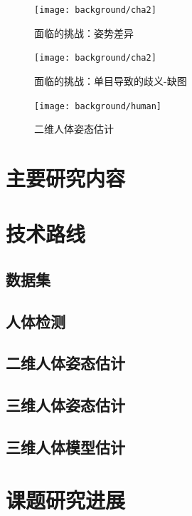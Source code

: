 \begin{figure}[ht]
    \centering
    \texttt{[image: background/cha2]}
    \caption{\label{fig:cha2}面临的挑战：姿势差异}
\end{figure}

\begin{figure}[ht]
    \centering
    \texttt{[image: background/cha2]}
    \caption{\label{fig:cha3}面临的挑战：单目导致的歧义-缺图}
\end{figure}

\begin{figure}[ht]
    \centering
    \texttt{[image: background/human]}
    \caption{\label{fig:cha3}二维人体姿态估计}
\end{figure}

\section{主要研究内容}

\section{技术路线}

\subsection{数据集}

\subsection{人体检测}

\subsection{二维人体姿态估计}

\subsection{三维人体姿态估计}

\subsection{三维人体模型估计}


\section{课题研究进展}
